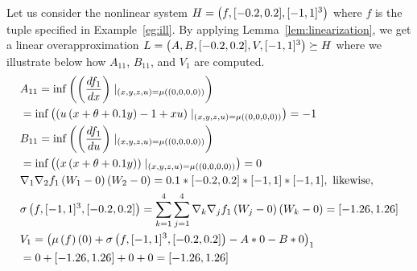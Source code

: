 %
\begin{example}
Let us consider the nonlinear system $H = \left(f,[-0.2,0.2],[-1,1]^3\right)$
where $f$ is the tuple specified in Example~\ref{eg:ill}.  By applying
Lemma~\ref{lem:linearization}, we get a linear overapproximation $L
= \left(A,B,[-0.2,0.2],V,[-1,1]^3\right)\succeq H$ where we illustrate below
how $A_{11}$, $B_{11}$, and $V_{1}$ are computed.
%
\begin{align*}
& A_{11} = \inf\rb{\rb{\frac{df_1}{dx}}\mid_{\rb{x,y,z,u} =
\ivmat{(0,0,0,0)}}} \\ & = \inf\rb{\rb{u\rb{ x + \theta + 0.1y } - 1 +
xu}\mid_{\rb{x,y,z,u} = \ivmat{(0,0,0,0)}}} = -1 \\
%
& B_{11} = \inf\rb{\rb{\frac{df_1}{du}}\mid_{\rb{x,y,z,u} =
\ivmat{(0,0,0,0)}}} \\ &= \inf\rb{\rb{x\rb{ x + \theta + 0.1y
}}\mid_{\rb{x,y,z,u} = \ivmat{(0,0,0,0)}}} = 0 \\
%
& \nabla_1\nabla_2f_1\rb{W_1-0}\rb{W_2-0} =
0.1*[-0.2,0.2]*[-1,1]*[-1,1],~\text{likewise},\\
& \taylor{f}{[-1,1]^3}{[-0.2,0.2]}
= \sum_{k=1}^4\sum_{j=1}^4\nabla_k\nabla_jf_1\rb{W_j-0}\rb{W_k-0}
= [-1.26, 1.26]\\
%
& V_1 = \rb{\iv{f}{ 0 }
+ \taylor{f}{[-1,1]^3}{[-0.2,0.2]}
- A*0 - B*0}_1 \\
& = 0 + [-1.26,1.26] + 0 + 0 = [-1.26, 1.26]
\end{align*}
%
\end{example}
%
